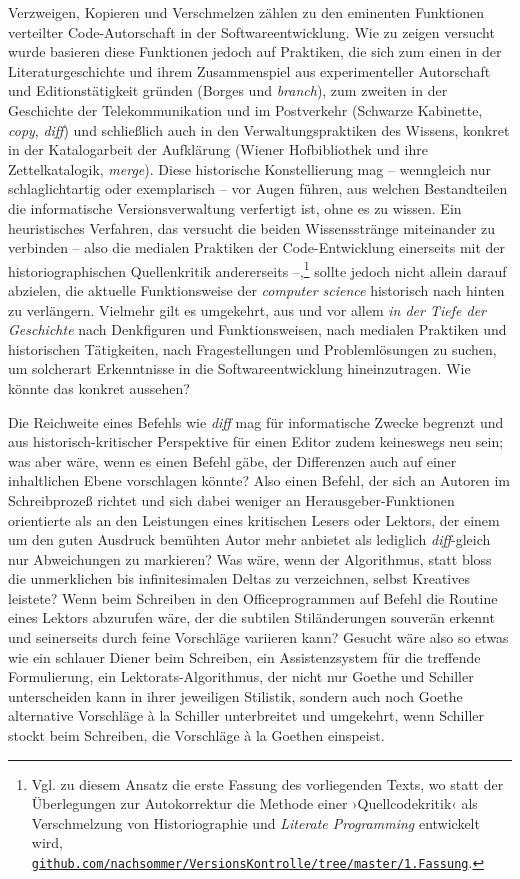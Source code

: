 \documentclass[a4paper,11pt]{article}
\newcommand{\inanf}[1]{›#1‹}
\begin{document}
Verzweigen, Kopieren und Verschmelzen zählen zu den eminenten Funktionen verteilter Code-Autorschaft in der Softwareentwicklung. Wie zu zeigen versucht wurde basieren diese Funktionen jedoch auf Praktiken, die sich zum einen in der Literaturgeschichte und ihrem Zusammenspiel aus experimenteller Autorschaft und Editionstätigkeit gründen (Borges und \emph{branch}), zum zweiten in der Geschichte der Telekommunikation und im Postverkehr (Schwarze Kabinette, \emph{copy}, \emph{diff}) und schließlich auch in den Verwaltungspraktiken des Wissens, konkret in der Katalogarbeit der Aufklärung (Wiener Hofbibliothek und ihre Zettelkatalogik, \emph{merge}). Diese historische Konstellierung mag – wenngleich nur schlaglichtartig oder exemplarisch – vor Augen führen, aus welchen Bestandteilen die informatische Versionsverwaltung verfertigt ist, ohne es zu wissen. Ein heuristisches Verfahren, das versucht die beiden Wissensstränge miteinander zu verbinden – also die medialen Praktiken der Code-Entwicklung einerseits mit der historiographischen Quellenkritik andererseits –,\footnote{Vgl. zu diesem Ansatz die erste Fassung des vorliegenden Texts, wo statt der Überlegungen zur Autokorrektur die Methode einer \inanf{Quellcodekritik} als Verschmelzung von Historiographie und \emph{Literate Programming} entwickelt wird, \href{https://github.com/nachsommer/VersionsKontrolle/tree/master/1.Fassung}{\texttt{github.com/nachsommer/Vers\-ionsKontrolle/tree/master/1.Fassung}}.} sollte jedoch nicht allein darauf abzielen, die aktuelle Funktionsweise der \emph{computer science} historisch nach hinten zu verlängern. Vielmehr gilt es  umgekehrt, aus und vor allem \emph{in der Tiefe der Geschichte} nach Denkfiguren und Funktionsweisen, nach medialen Praktiken und historischen Tätigkeiten, nach Fragestellungen und Problemlösungen zu suchen, um solcherart Erkenntnisse in die Softwareentwicklung hineinzutragen. Wie könnte das konkret aussehen? 

Die Reichweite eines Befehls wie \emph{diff} mag für informatische Zwecke begrenzt und aus historisch-kritischer Perspektive für einen Editor zudem keineswegs neu sein; was aber wäre, wenn es einen Befehl gäbe, der Differenzen auch auf einer inhaltlichen Ebene vorschlagen könnte? Also einen Befehl, der sich an Autoren im Schreibprozeß richtet und sich dabei weniger an Herausgeber-Funktionen orientierte als an den Leistungen eines kritischen Lesers oder Lektors, der einem um den guten Ausdruck bemühten Autor mehr anbietet als lediglich \emph{diff}-gleich nur Abweichungen zu markieren? Was wäre, wenn der Algorithmus, statt bloss die unmerklichen bis infinitesimalen Deltas zu verzeichnen, selbst Kreatives leistete? Wenn beim Schreiben in den Officeprogrammen auf Befehl die Routine eines Lektors abzurufen wäre, der die subtilen Stiländerungen souverän erkennt und seinerseits durch feine Vorschläge variieren kann? Gesucht wäre also so etwas wie ein schlauer Diener beim Schreiben, ein Assistenzsystem für die treffende Formulierung, ein Lektorats-Algorithmus, der nicht nur Goethe und Schiller unterscheiden kann in ihrer jeweiligen Stilistik, sondern auch noch Goethe alternative Vorschläge à la Schiller unterbreitet und umgekehrt, wenn Schiller stockt beim Schreiben, die Vorschläge à la Goethen einspeist.
\end{document}
